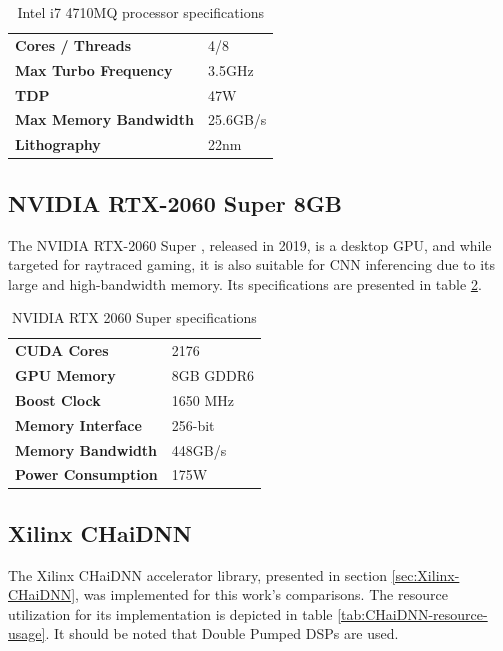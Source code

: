 \begin{table}[H]
	\caption{Intel i7 4710MQ processor specifications}
	\label{tab:Intel-i7-4710MQ-specs}
	\centering
	\begin{tabular}{ll}
		\toprule
		\textbf{Cores / Threads} & 4/8\\
		\textbf{Max Turbo Frequency} & 3.5GHz\\
		\textbf{TDP} & 47W\\
		\textbf{Max Memory Bandwidth} & 25.6GB/s\\
		\textbf{Lithography} & 22nm\\
		\bottomrule
	\end{tabular}
\end{table}

\subsection{NVIDIA RTX-2060 Super 8GB}
The NVIDIA RTX-2060 Super \cite{NVIDIA-RTX-2060-Super}, released in 2019, is a desktop GPU, and while targeted for raytraced gaming, it is also suitable for CNN inferencing due to its large and high-bandwidth memory. Its specifications are presented in table \ref{tab:NVIDIA-RTX-2060-Super-specs}.

\begin{table}[H]
	\caption{NVIDIA RTX 2060 Super specifications}
	\label{tab:NVIDIA-RTX-2060-Super-specs}
	\centering
	\begin{tabular}{ll}
		\toprule
		\textbf{CUDA Cores} & 2176\\
		\textbf{GPU Memory} & 8GB GDDR6\\
		\textbf{Boost Clock} & 1650 MHz\\
		\textbf{Memory Interface} & 256-bit\\
		\textbf{Memory Bandwidth} & 448GB/s\\
		\textbf{Power Consumption} & 175W\\
		\bottomrule
	\end{tabular}
\end{table}

\subsection{Xilinx CHaiDNN}
The Xilinx CHaiDNN accelerator library, presented in section \ref{sec:Xilinx-CHaiDNN}, was implemented for this work's comparisons. The resource utilization for its implementation is depicted in table \ref{tab:CHaiDNN-resource-usage}. It should be noted that Double Pumped DSPs are used.


